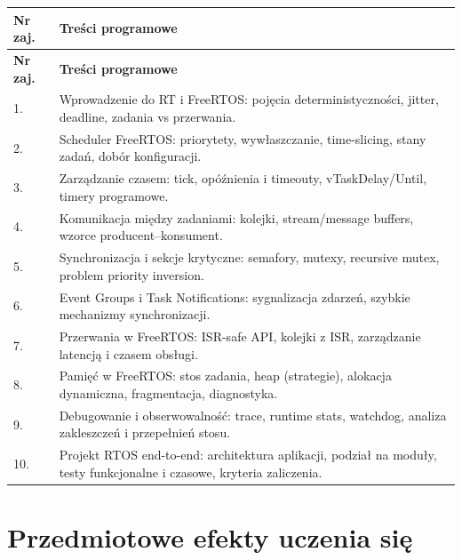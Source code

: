 \documentclass[12pt, a4paper]{article}
\newcommand{\thdrule}{\noalign{\global\setlength{\extrarowheight}{0pt}}}
\newcommand{\thdend}{\noalign{\global\setlength{\extrarowheight}{3pt}}}
\begin{document}
{\scriptsize
\begin{longtable}{m{1.5cm}m{14.5cm}}
\thdrule\toprule
\rowcolor{pjatkRed} {\color{white}\textbf{Nr zaj.}} & {\color{white}\textbf{Treści programowe}} \\
\midrule\thdend
\endfirsthead
\thdrule\toprule
\rowcolor{pjatkRed} {\color{white}\textbf{Nr zaj.}} & {\color{white}\textbf{Treści programowe}} \\
\midrule\thdend
\endhead
  \rowcolor{tableRowLight} 1. & Wprowadzenie do RT i FreeRTOS: pojęcia deterministyczności, jitter, deadline, zadania vs przerwania. \\
  \rowcolor{tableRowAlt} 2. & Scheduler FreeRTOS: priorytety, wywłaszczanie, time-slicing, stany zadań, dobór konfiguracji. \\
  \rowcolor{tableRowLight} 3. & Zarządzanie czasem: tick, opóźnienia i timeouty, vTaskDelay/Until, timery programowe. \\
  \rowcolor{tableRowAlt} 4. & Komunikacja między zadaniami: kolejki, stream/message buffers, wzorce producent–konsument. \\
  \rowcolor{tableRowLight} 5. & Synchronizacja i sekcje krytyczne: semafory, mutexy, recursive mutex, problem priority inversion. \\
  \rowcolor{tableRowAlt} 6. & Event Groups i Task Notifications: sygnalizacja zdarzeń, szybkie mechanizmy synchronizacji. \\
  \rowcolor{tableRowLight} 7. & Przerwania w FreeRTOS: ISR-safe API, kolejki z ISR, zarządzanie latencją i czasem obsługi. \\
  \rowcolor{tableRowAlt} 8. & Pamięć w FreeRTOS: stos zadania, heap (strategie), alokacja dynamiczna, fragmentacja, diagnostyka. \\
  \rowcolor{tableRowLight} 9. & Debugowanie i obserwowalność: trace, runtime stats, watchdog, analiza zakleszczeń i przepełnień stosu. \\
  \rowcolor{tableRowAlt} 10. & Projekt RTOS end-to-end: architektura aplikacji, podział na moduły, testy funkcjonalne i czasowe, kryteria zaliczenia. \\
\bottomrule
\end{longtable}}

\section{Przedmiotowe efekty uczenia się}
\end{document}
